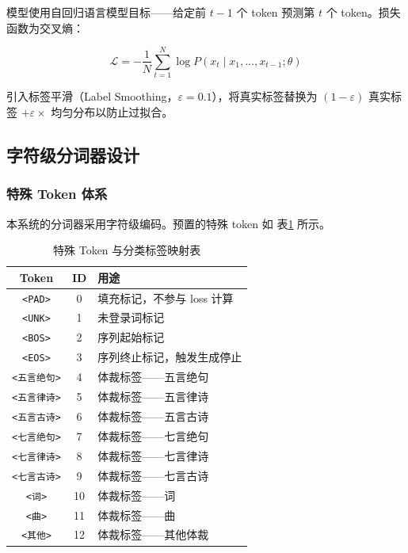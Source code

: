 \documentclass[a4paper, 12pt, centering, AutoFakeBold]{article}
\begin{document}
模型使用自回归语言模型目标——给定前 $t-1$ 个 token 预测第 $t$ 个 token。损失函数为交叉熵：

\begin{equation} \label{eq:loss}
\mathcal{L} = -\frac{1}{N} \sum_{t=1}^{N} \log P(x_t \mid x_1, \ldots, x_{t-1}; \theta)
\end{equation}

引入标签平滑（Label Smoothing，$\varepsilon = 0.1$），将真实标签替换为 $(1-\varepsilon)$ 真实标签 $+ \varepsilon \times$ 均匀分布以防止过拟合。

\subsection{字符级分词器设计}

\subsubsection{特殊 Token 体系}

本系统的分词器采用字符级编码。预置的特殊 token 如 表\ref{tab:token} 所示。

\begin{table}[H]
\centering
\caption{特殊 Token 与分类标签映射表}
\label{tab:token}
\begin{tabular}{|c|c|l|}
\hline
\textbf{Token} & \textbf{ID} & \textbf{用途} \\
\hline
\texttt{<PAD>}  & 0  & 填充标记，不参与 loss 计算 \\
\texttt{<UNK>}  & 1  & 未登录词标记 \\
\texttt{<BOS>}  & 2  & 序列起始标记 \\
\texttt{<EOS>}  & 3  & 序列终止标记，触发生成停止 \\
\texttt{<五言绝句>} & 4  & 体裁标签——五言绝句 \\
\texttt{<五言律诗>} & 5  & 体裁标签——五言律诗 \\
\texttt{<五言古诗>} & 6  & 体裁标签——五言古诗 \\
\texttt{<七言绝句>} & 7  & 体裁标签——七言绝句 \\
\texttt{<七言律诗>} & 8  & 体裁标签——七言律诗 \\
\texttt{<七言古诗>} & 9  & 体裁标签——七言古诗 \\
\texttt{<词>}    & 10 & 体裁标签——词 \\
\texttt{<曲>}    & 11 & 体裁标签——曲 \\
\texttt{<其他>}  & 12 & 体裁标签——其他体裁 \\
\hline
\end{tabular}
\end{table}
\end{document}

